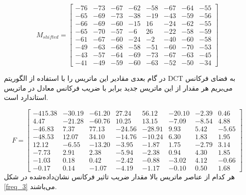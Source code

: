 \[
        M_{shifted} = \begin{bmatrix}
                -76 & -73 & -67 & -62 & -58 & -67 & -64 & -55\\
                -65 & -69 & -73 & -38 & -19 & -43 & -59 & -56 \\
                -66 & -69 & -60 & -15 & 16 & -24 & -62 & -55 \\
                -65 & -70 & -57 & -6 & 26 & -22 & -58 & -59 \\
                -61 & -67 & -60 & -24 & -2 & -40 & -60 & -58 \\
                -49 & -63 & -68 & -58 & -51 & -60 & -70 & -53 \\
                -43 & -57 & -64 & -69 & -73 & -67 & -63 & -45 \\
                -41 & -49 & -59 & -60 & -63 & -52 & -50 & -34 

        \end{bmatrix}
\]

در گام بعدی مقادیر این ماتریس را با استفاده از الگوریتم 
DCT به فضای فرکانس می‌بریم
هر مقدار از این ماتریس جدید برابر با ضریب فرکانس معادل در ماتریس 
استاندارد است. 

\[
        F = \begin{bmatrix}
                -415.38 & -30.19 & -61.20 & 27.24 & 56.12 & -20.10 & -2.39 & 0.46\\
                4.47 & -21.28 & -60.76 & 10.25 & 13.15 & -7.09 & -8.54 & 4.88 \\
                -46.83 & 7.37 & 77.13 & -24.56 & -28.91 & 9.93 & 5.42 & -5.65 \\
                -48.53 & 12.07 & 34.10 & -14.76 & -10.24 & 6.30 & 1.83 & 1.95 \\
                12.12 & -6.55 & -13.20 & -3.95 & -1.87 & 1.75 & -2.79 & 3.14 \\
                -7.73 & 2.91 & 2.38 & -5.94 & -2.38 & 0.94 & 4.30 & 1.85 \\
                -1.03 & 0.18 & 0.42 & -2.42 & -0.88 & -3.02 & 4.12 & -0.66 \\
                -0.17 & 0.14 & -1.07 & -4.19 & -1.17 & -0.10 & 0.50 & 1.68 

        \end{bmatrix}
\]
هر کدام از عناصر ماتریس بالا مقدار ضریب تاثیر فرکانس نشان‌داده‌شده در شکل 
\ref{freq_3} 
می‌باشند. 


